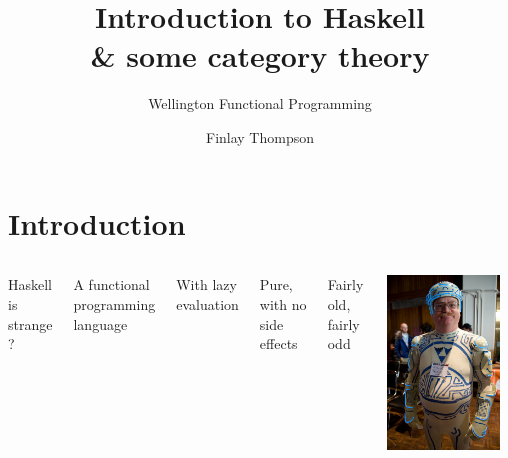 \documentclass[xcolor={table}]{beamer}
\title{Introduction to Haskell\\\& some category theory}
\subtitle{Wellington Functional Programming}
\author{Finlay Thompson}
\date{}
\begin{document}
\titleslide

\section{Introduction}

\begin{frame}{}{}

    \begin{columns}
    {\Large Haskell is strange ? }

    \pause\bigskip
    A functional programming language

    \pause\bigskip
    With lazy evaluation
    
    \pause\bigskip
    Pure, with no side effects 
    
    \pause\bigskip
    Fairly old\pause, fairly odd

    \includegraphics[width=0.9\textwidth]{images/tron-guy.jpg}
        
    \end{columns}

\end{frame}
\end{document}
